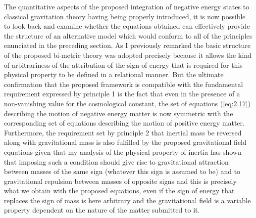 \documentclass[notitlepage,12pt]{report}
\begin{document}
\noindent The quantitative aspects of the proposed integration of negative energy states to classical gravitation theory having being properly introduced, it is now possible to look back and examine whether the equations obtained can effectively provide the structure of an alternative model which would conform to all of the principles enunciated in the preceding section. As I previously remarked the basic structure of the proposed bi-metric theory was adopted precisely because it allows the kind of arbitrariness of the attribution of the sign of energy that is required for this physical property to be defined in a relational manner. But the ultimate confirmation that the proposed framework is compatible with the fundamental requirement expressed by principle 1 is the fact that even in the presence of a non-vanishing value for the cosmological constant, the set of equations (\ref{eq:2.17}) describing the motion of negative energy matter is now symmetric with the corresponding set of equations describing the motion of positive energy matter. Furthermore, the requirement set by principle 2 that inertial mass be reversed along with gravitational mass is also fulfilled by the proposed gravitational field equations given that my analysis of the physical property of inertia has shown that imposing such a condition should give rise to gravitational attraction between masses of the same sign (whatever this sign is assumed to be) and to gravitational repulsion between masses of opposite signs and this is precisely what we obtain with the proposed equations, even if the sign of energy that replaces the sign of mass is here arbitrary and the gravitational field is a variable property dependent on the nature of the matter submitted to it. 
\end{document}
